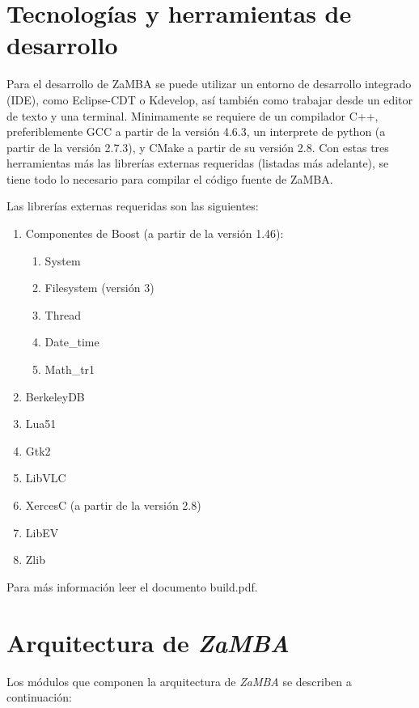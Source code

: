\section{Tecnologías y herramientas de desarrollo}
Para el desarrollo de ZaMBA se puede utilizar un entorno de desarrollo integrado (IDE), como Eclipse-CDT o Kdevelop, así también como trabajar 
desde un editor de texto y una terminal. Minimamente se requiere de un compilador C++, preferiblemente GCC a partir de la versión 4.6.3, un interprete de python 
(a partir de la versión 2.7.3), y CMake a partir de su versión 2.8. Con estas tres herramientas más las librerías externas requeridas (listadas más adelante), 
se tiene todo lo necesario para compilar el código fuente de ZaMBA.

Las librerías externas requeridas son las siguientes:
\begin{enumerate}
\item Componentes de Boost (a partir de la versión 1.46):
\begin{enumerate}
\item System
\item Filesystem (versión 3)
\item Thread
\item Date\_time
\item Math\_tr1
\end{enumerate}
\item BerkeleyDB
\item Lua51
\item Gtk2
\item LibVLC
\item XercesC (a partir de la versión 2.8)
\item LibEV
\item Zlib
\end{enumerate}

Para más información leer el documento build.pdf.

\section{Arquitectura de \emph{ZaMBA}}

Los módulos que componen la arquitectura de \emph{ZaMBA} se describen a  continuación:


